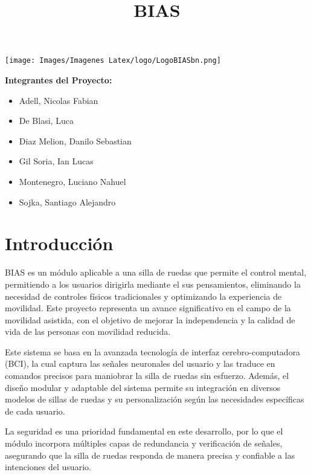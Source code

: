 \documentclass{article}
\date{}
\begin{document}
 

\begin{center}
    \texttt{[image: Images/Imagenes Latex/logo/LogoBIASbn.png]}\\ 
\end{center}
    
\title{BIAS} 

\vspace{1cm} 

\textbf{Integrantes del Proyecto:} 

\begin{itemize}
    \item Adell, Nicolas Fabian
    \item De Blasi, Luca
    \item Diaz Melion, Danilo Sebastian
    \item Gil Soria, Ian Lucas
    \item Montenegro, Luciano Nahuel
    \item Sojka, Santiago Alejandro
\end{itemize}

\tableofcontents 

\newpage 

\section{Introducción}

BIAS es un módulo aplicable a una silla de ruedas que permite el control mental, permitiendo a los usuarios dirigirla mediante el sus pensamientos, eliminando la necesidad de controles físicos tradicionales y optimizando la experiencia de movilidad. Este proyecto representa un avance significativo en el campo de la movilidad asistida, con el objetivo de mejorar la independencia y la calidad de vida de las personas con movilidad reducida.

Este sistema se basa en la avanzada tecnología de interfaz cerebro-computadora (BCI), la cual captura las señales neuronales del usuario y las traduce en comandos precisos para maniobrar la silla de ruedas sin esfuerzo. Además, el diseño modular y adaptable del sistema permite su integración en diversos modelos de sillas de ruedas y su personalización según las necesidades específicas de cada usuario. 

La seguridad es una prioridad fundamental en este desarrollo, por lo que el módulo incorpora múltiples capas de redundancia y verificación de señales, asegurando que la silla de ruedas responda de manera precisa y confiable a las intenciones del usuario. 
\end{document}
